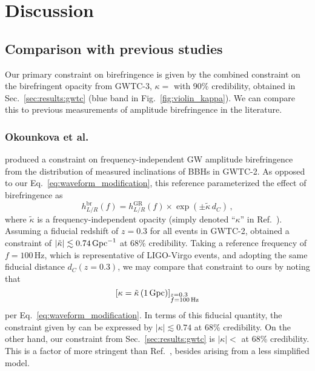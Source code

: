 \documentclass[aps,prd,twocolumn,superscriptaddress,preprintnumbers,floatfix,nofootinbib]{revtex4-2}
\begin{document}
\section{Discussion}
\label{sec:Discussion}

\subsection{Comparison with previous studies}

Our primary constraint on birefringence is given by the combined constraint on the birefringent opacity from GWTC-3, $\kappa =$  with 90\% credibility, obtained in Sec.~\ref{sec:results:gwtc} (blue band in Fig.~\ref{fig:violin_kappa}).
We can compare this to previous measurements of amplitude birefringence in the literature.

\subsubsection{Okounkova et al.}
\citet{Okounkova_2022} produced a constraint on frequency-independent \ac{GW} amplitude birefringence from the distribution of measured inclinations of \acp{BBH} in GWTC-2.
As opposed to our Eq.~\eqref{eq:waveform_modification}, this reference parameterized the effect of birefringence as
\begin{equation}
\label{eq:freqindep}
    h_{L/R}^{\mathrm{br}}(f) =
    h_{L/R}^{\mathrm{GR}}(f) \times
    \exp\left(\pm \tilde{\kappa}\, d_C\right)\,,
\end{equation}
where $\tilde{\kappa}$ is a frequency-independent opacity (simply denoted ``$\kappa$'' in Ref.~\cite{Okounkova_2022}).
Assuming a fiducial redshift of $z=0.3$ for all events in GWTC-2, \citet{Okounkova_2022} obtained a constraint of $|\tilde{\kappa}| \lesssim 0.74\, {\rm Gpc}^{-1}$ at 68\% credibility.
Taking a reference frequency of $f=100\, \mathrm{Hz}$, which is representative of LIGO-Virgo events, and adopting the same fiducial distance $d_C(z=0.3)$, we may compare that constraint to ours by noting that
\begin{equation}
    \left[ \kappa = \tilde{\kappa}\left({1\, \mathrm{Gpc}}\right) \right]_{\raisebox{1ex}{$\begin{subarray}{l} z=0.3 \\ f=100\,{\rm Hz} \end{subarray}$}}
\end{equation}
per Eq.~\eqref{eq:waveform_modification}.
In terms of this fiducial quantity, the constraint given by \citet{Okounkova_2022} can be expressed by $|{\kappa}| \lesssim 0.74$  at 68\% credibility.
On the other hand, our constraint from Sec.~\ref{sec:results:gwtc} is $|\kappa| <$  at 68\% credibility.
This is a factor of  more stringent than Ref.~\cite{Okounkova_2022}, besides arising from a less simplified model.
\end{document}

